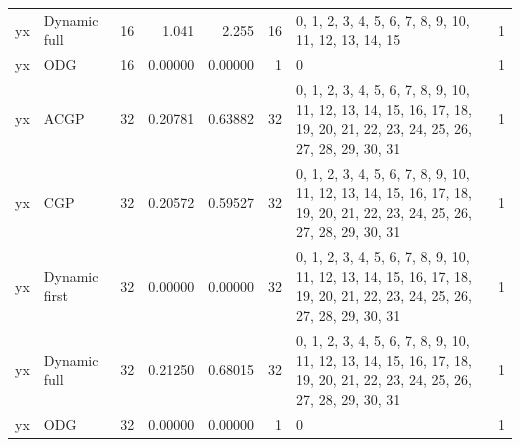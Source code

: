 \documentclass[10pt,a4paper]{article}
\begin{document}
\begin{longtable}{@{}p{23mm}p{29mm}rrrrp{36mm}r@{}}
yx & Dynamic full & 16 & 1.041 & 2.255 & 16 & 0, 1, 2, 3, 4, 5, 6, 7, 8, 9, 10, 11, 12, 13, 14, 15 & 1 \\
yx & ODG & 16 & 0.00000 & 0.00000 & 1 & 0 & 1 \\
yx & ACGP & 32 & 0.20781 & 0.63882 & 32 & 0, 1, 2, 3, 4, 5, 6, 7, 8, 9, 10, 11, 12, 13, 14, 15, 16, 17, 18, 19, 20, 21, 22, 23, 24, 25, 26, 27, 28, 29, 30, 31 & 1 \\
yx & CGP & 32 & 0.20572 & 0.59527 & 32 & 0, 1, 2, 3, 4, 5, 6, 7, 8, 9, 10, 11, 12, 13, 14, 15, 16, 17, 18, 19, 20, 21, 22, 23, 24, 25, 26, 27, 28, 29, 30, 31 & 1 \\
yx & Dynamic first & 32 & 0.00000 & 0.00000 & 32 & 0, 1, 2, 3, 4, 5, 6, 7, 8, 9, 10, 11, 12, 13, 14, 15, 16, 17, 18, 19, 20, 21, 22, 23, 24, 25, 26, 27, 28, 29, 30, 31 & 1 \\
yx & Dynamic full & 32 & 0.21250 & 0.68015 & 32 & 0, 1, 2, 3, 4, 5, 6, 7, 8, 9, 10, 11, 12, 13, 14, 15, 16, 17, 18, 19, 20, 21, 22, 23, 24, 25, 26, 27, 28, 29, 30, 31 & 1 \\
yx & ODG & 32 & 0.00000 & 0.00000 & 1 & 0 & 1 \\
\end{longtable}\normalsize\setlength{\tabcolsep}{6pt}
\clearpage
\end{document}
